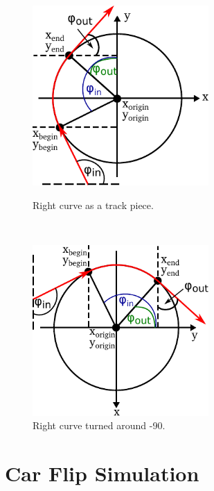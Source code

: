 \begin{figure}
\begin{minipage}{0.45\textwidth}
    \centering
    \includegraphics[width=0.6\textwidth]{RightCurve}
    \caption{Right curve as a track piece.}
    \label{fig:curve_right}
\end{minipage}
\begin{minipage}{0.1\textwidth}
    \centering
    \phantom{}\ \ 
\end{minipage}
\begin{minipage}{0.45\textwidth}
    \centering
    \includegraphics[width=0.6\textwidth]{RightCurveRotated}
    \caption{Right curve turned around -90\textdegree.}
    \label{fig:curve_right_rotated}
\end{minipage}
\end{figure}

\section{Car Flip Simulation}

